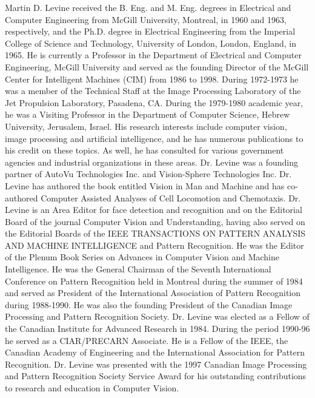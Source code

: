 \documentclass[10pt,journal,cspaper,compsoc]{IEEEtran}
\begin{document}
\begin{IEEEbiography}{{Martin D. Levine}}
received
the B. Eng. and M. Eng. degrees in Electrical and Computer Engineering from McGill University, Montreal, in 1960 and 1963, respectively, and the Ph.D. degree in Electrical Engineering from the Imperial College of Science and Technology, University of London, London, England, in 1965. He is currently a Professor in the Department of Electrical and Computer Engineering, McGill University and served as the founding Director of the McGill Center for Intelligent Machines (CIM) from 1986 to 1998. During 1972-1973 he was a member of the Technical Staff at the Image Processing Laboratory of the Jet Propulsion Laboratory, Pasadena, CA. During the 1979-1980 academic year, he was a Visiting Professor in the Department of Computer Science, Hebrew University, Jerusalem, Israel. His research interests include computer vision, image processing and artificial intelligence, and he has numerous publications to his credit on these topics. As well, he has consulted for various government agencies and industrial organizations in these areas. Dr. Levine was a founding partner of AutoVu Technologies Inc. and Vision-Sphere Technologies Inc. Dr. Levine has authored the book entitled Vision in Man and Machine and has co-authored Computer Assisted Analyses of Cell Locomotion and Chemotaxis. Dr. Levine is an Area Editor for face detection and recognition and on the Editorial Board of the journal Computer Vision and Understanding, having also served on the Editorial Boards of the IEEE TRANSACTIONS ON PATTERN ANALYSIS AND MACHINE INTELLIGENCE and Pattern Recognition. He was the Editor of the Plenum Book Series on Advances in Computer Vision and Machine Intelligence. He was the General Chairman of the Seventh International Conference on Pattern Recognition held in Montreal during the summer of 1984 and served as President of the International Association of Pattern Recognition during 1988-1990. He was also the founding President of the Canadian Image Processing and Pattern Recognition Society. Dr. Levine was elected as a Fellow of the Canadian Institute for Advanced Research in 1984. During the period 1990-96 he served as a CIAR/PRECARN Associate. He is a Fellow of the IEEE, the Canadian Academy of Engineering and the International Association for Pattern Recognition. Dr. Levine was presented with the 1997 Canadian Image Processing and Pattern Recognition Society Service Award for his outstanding contributions to research and education in Computer Vision.
\end{IEEEbiography}
\end{document}

